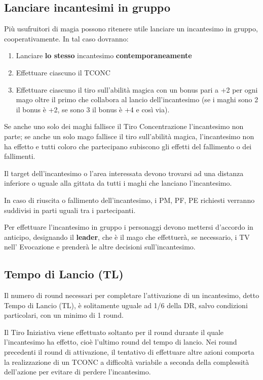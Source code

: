 {\raggedright \subsection{Lanciare incantesimi in gruppo}}

Pi\`u usufruitori di magia possono ritenere utile lanciare un
incantesimo in gruppo, cooperativamente. In tal caso dovranno:

\begin{enumerate}
\item Lanciare \textbf{lo stesso} incantesimo \textbf{contemporaneamente}
\item Effettuare ciascuno il TCONC
\item Effettuare ciascuno il tiro sull'abilit\`a magica con un bonus
  pari a +2 per ogni mago oltre il primo che collabora al lancio
  dell'incantesimo (se i maghi sono 2 il bonus \`e +2, se sono 3 il
  bonus \`e +4 e cos\`i via).
\end{enumerate}

Se anche uno solo dei maghi fallisce il Tiro Concentrazione
l'incantesimo non parte; se anche un solo mago fallisce il tiro
sull'abilit\`a magica, l'incantesimo non ha effetto e tutti coloro che
partecipano subiscono gli effetti del fallimento o dei fallimenti.

Il target dell'incantesimo o l'area interessata devono trovarsi ad
una distanza inferiore o uguale alla gittata da tutti i maghi che
lanciano l'incantesimo.

In caso di riuscita o fallimento dell'incantesimo, i PM, PF, PE
richiesti verranno suddivisi in parti uguali tra i partecipanti.

Per effettuare l'incantesimo in gruppo i personaggi devono mettersi
d'accordo in anticipo, designando il \textbf{leader}, che \`e il mago
che effettuer\`a, se necessario, i TV nell' Evocazione e prender\`a le
altre decisioni sull'incantesimo.
\fi

\subsection{Tempo di Lancio (TL)} 

Il numero di round necessari per completare l'attivazione di un
incantesimo, detto Tempo di Lancio (TL), \`e solitamente uguale ad
1/6 della DR, salvo condizioni particolari, con un minimo di 1 round.

Il Tiro Iniziativa viene effettuato soltanto per il round durante il
quale l'incantesimo ha effetto, cio\`e l'ultimo round del tempo di
lancio. Nei round precedenti il round di attivazione, il tentativo di
effettuare altre azioni comporta la realizzazione di un TCONC a
difficolt\`a variabile a seconda della complessit\`a dell'azione
per evitare di perdere l'incantesimo.

